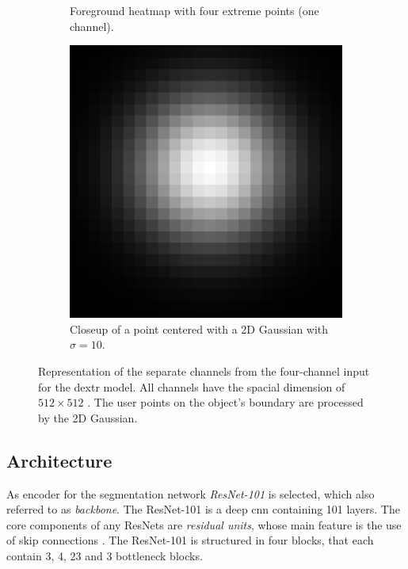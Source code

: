 \begin{figure}
\begin{subfigure}[b]{0.3\textwidth}
		\caption{Foreground heatmap with four extreme points (one channel).}
		\label{fig:ch3:sec3:fg_channel}
	\end{subfigure}
	\hfill
	\begin{subfigure}[b]{0.3\textwidth}
		\centering
		\includegraphics[width=\textwidth]{figures/chap33_gaussian_point.png}
		\caption{Closeup of a point centered with a 2D Gaussian with $\sigma = 10$.}
		\label{fig:ch3:sec3:gauss_centered_point}
	\end{subfigure}
	\caption[Four-channel DEXTR model input]{
		Representation of the separate channels from the four-channel input for the \gls{dextr} model.
		All channels have the spacial dimension of $512 \times 512$ .
		The user points on the object's boundary are processed by the 2D Gaussian.
	} \label{fig:ch3:sec3:model_input_channels}
\end{figure}


\subsection{Architecture}\label{ord:ch3:sec3:subsec3}

As encoder for the segmentation network \textit{ResNet-101} \cite{He16-ResNet} is selected, which also referred to as \textit{backbone}.
The ResNet-101 is a deep \gls{cnn} containing 101 layers.
The core components of any ResNets are \textit{residual units}, whose main feature is the use of skip connections \cite{Ger17-HandsOn}.
The ResNet-101 is structured in four blocks, that each contain 3, 4, 23 and 3 bottleneck blocks.

